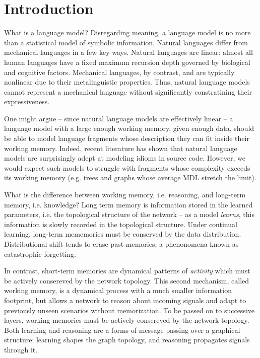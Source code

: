 \documentclass[sigconf]{acmart}
\begin{document}
  \maketitle

  \section{Introduction}\label{sec:introduction}

 What is a language model? Disregarding meaning, a language model is no more than a statistical model of symbolic information. Natural languages differ from mechanical languages in a few key ways. Natural languages are linear: almost all human languages have a fixed maximum recursion depth governed by biological and cognitive factors. Mechanical languages, by contrast, and are typically nonlinear due to their metalinguistic properties. Thus, natural language models cannot represent a mechanical language without significantly constratining their expressiveness.

One might argue -- since natural language models are effectively linear -- a language model with a large enough working memory, given enough data, should be able to model language fragments whose description they can fit inside their working memory. Indeed, recent literature has shown that natural language models are surprisingly adept at modeling idioms in source code. However, we would expect such models to struggle with fragments whose complexity exceeds its working memory (e.g. trees and graphs whose average MDL stretch the limit).

What is the difference between working memory, i.e. reasoning, and long-term memory, i.e. knowledge? Long term memory is information stored in the learned parameters, i.e. the topological structure of the network -- as a model \textit{learns}, this information is slowly recorded in the topological structure. Under continual learning, long-term mememories must be conserved by the data distribution. Distributional shift tends to erase past memories, a phenonomena known as catastrophic forgetting.

In contrast, short-term memories are dynamical patterns of \textit{activity} which must be actively consereved by the network topology. This second mechanism, called working memory, is a dynamical process with a much smaller information footprint, but allows a network to reason about incoming signals and adapt to previously unseen scenarios without memorization. To be passed on to successive layers, working memories must be actively consereved by the network topology. Both learning and reasoning are a forms of message passing over a graphical structure: learning shapes the graph topology, and reasoning propagates signals through it.
\end{document}

